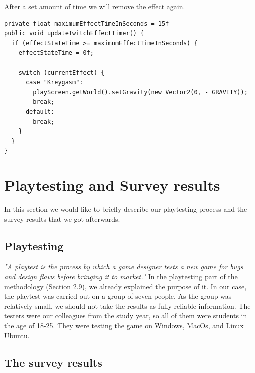 \documentclass[12p]{article}
\begin{document}
After a set amount of time we will remove the effect again.

\begin{verbatim}
private float maximumEffectTimeInSeconds = 15f
public void updateTwitchEffectTimer() {
  if (effectStateTime >= maximumEffectTimeInSeconds) {
    effectStateTime = 0f;

    switch (currentEffect) {
      case "Kreygasm":
        playScreen.getWorld().setGravity(new Vector2(0, - GRAVITY));
        break;
      default:
        break;
    }
  }
}
\end{verbatim}


\newpage
\section{Playtesting and Survey results}

In this section we would like to briefly describe our playtesting process and the survey results that we got afterwards.

\subsection{Playtesting}

\textit{"A playtest is the process by which a game designer tests a new game for bugs and design flaws before bringing it to market."} \cite{Playtest}
\newline \newline
In the playtesting part of the methodology (Section 2.9), we already explained the purpose of it. In our case, the playtest was carried out on a group of seven people. As the group was relatively small, we should not take the results as fully reliable information. The testers were our colleagues from the study year, so all of them were students in the age of 18-25. They were testing the game on Windows, MacOs, and Linux Ubuntu.

\subsection{The survey results}
\end{document}
